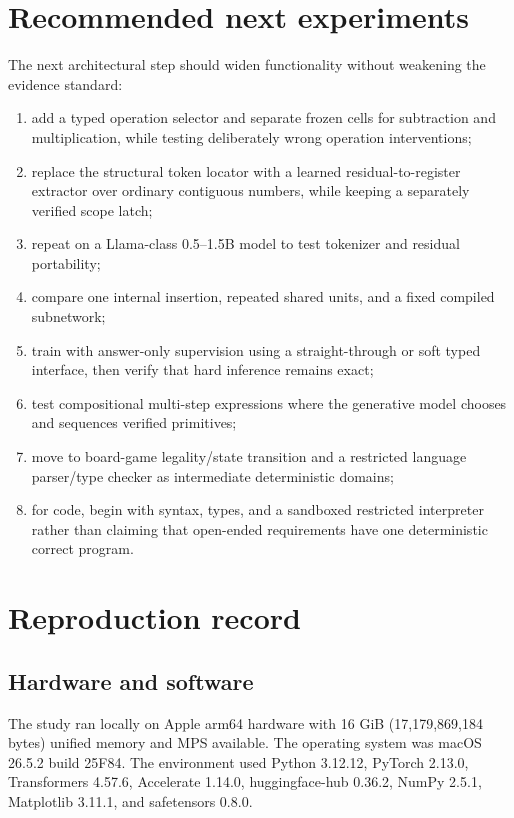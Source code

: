 \documentclass[11pt]{article}
\begin{document}
\section{Recommended next experiments}

The next architectural step should widen functionality without weakening the
evidence standard:

\begin{enumerate}
  \item add a typed operation selector and separate frozen cells for
  subtraction and multiplication, while testing deliberately wrong operation
  interventions;
  \item replace the structural token locator with a learned residual-to-register
  extractor over ordinary contiguous numbers, while keeping a separately
  verified scope latch;
  \item repeat on a Llama-class 0.5--1.5B model to test tokenizer and residual
  portability;
  \item compare one internal insertion, repeated shared units, and a fixed
  compiled subnetwork;
  \item train with answer-only supervision using a straight-through or soft
  typed interface, then verify that hard inference remains exact;
  \item test compositional multi-step expressions where the generative model
  chooses and sequences verified primitives;
  \item move to board-game legality/state transition and a restricted
  language parser/type checker as intermediate deterministic domains;
  \item for code, begin with syntax, types, and a sandboxed restricted
  interpreter rather than claiming that open-ended requirements have one
  deterministic correct program.
\end{enumerate}

\section{Reproduction record}

\subsection{Hardware and software}

The study ran locally on Apple arm64 hardware with 16 GiB
(17,179,869,184 bytes) unified memory and MPS available. The operating system
was macOS 26.5.2 build 25F84. The environment used Python 3.12.12,
PyTorch 2.13.0, Transformers 4.57.6, Accelerate 1.14.0,
huggingface-hub 0.36.2, NumPy 2.5.1, Matplotlib 3.11.1, and
safetensors 0.8.0.
\end{document}
